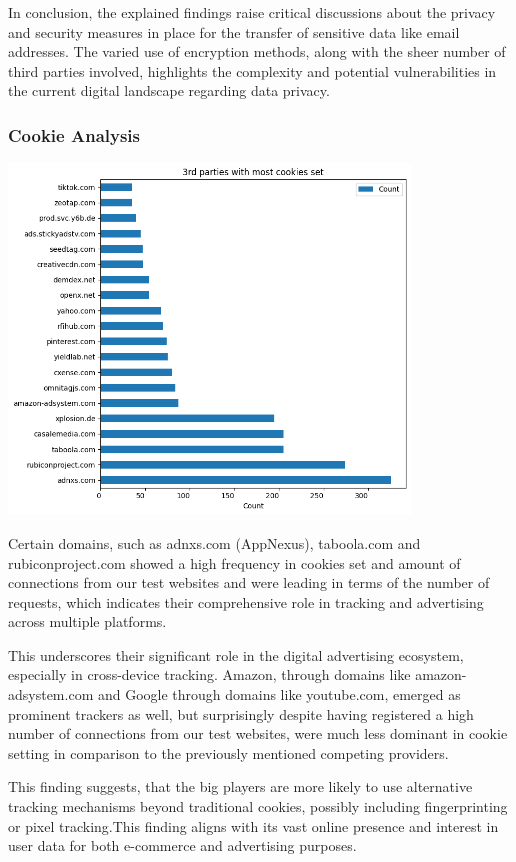 In conclusion, the explained findings raise critical discussions about the privacy and security measures in place for the transfer of sensitive data like email addresses. The varied use of encryption methods, along with the sheer number of third parties involved, highlights the complexity and potential vulnerabilities in the current digital landscape regarding data privacy.

\subsubsection{Cookie Analysis}
\includegraphics[width=0.8\textwidth]{./assets/thirdpartieswithmostcookiesset.png}
\vspace{0.8cm}

Certain domains, such as adnxs.com (AppNexus), taboola.com and rubiconproject.com showed a high frequency in cookies set and amount of connections from our test websites and were leading in terms of the number of requests, which indicates their comprehensive role in tracking and advertising across multiple platforms.

This underscores their significant role in the digital advertising ecosystem, especially in cross-device tracking. Amazon, through domains like amazon-adsystem.com and Google through domains like youtube.com, emerged as prominent trackers as well, but surprisingly despite having registered a high number of connections from our test websites, were much less dominant in cookie setting in comparison to the previously mentioned competing providers. 

This finding suggests, that the big players are more likely to use alternative tracking mechanisms beyond traditional cookies, possibly including fingerprinting or pixel tracking.This finding aligns with its vast online presence and interest in user data for both e-commerce and advertising purposes.

